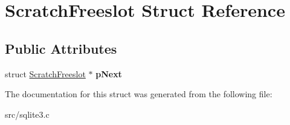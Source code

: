 \hypertarget{struct_scratch_freeslot}{\section{Scratch\-Freeslot Struct Reference}
\label{struct_scratch_freeslot}
}
\subsection*{Public Attributes}
\begin{DoxyCompactItemize}
\item 
\hypertarget{struct_scratch_freeslot_aca5c55a56a2a63a5be0756707a04bee8}{struct \hyperlink{struct_scratch_freeslot}{Scratch\-Freeslot} $\ast$ {\bfseries p\-Next}}\label{struct_scratch_freeslot_aca5c55a56a2a63a5be0756707a04bee8}

\end{DoxyCompactItemize}


The documentation for this struct was generated from the following file\-:\begin{DoxyCompactItemize}
\item 
src/sqlite3.\-c\end{DoxyCompactItemize}
